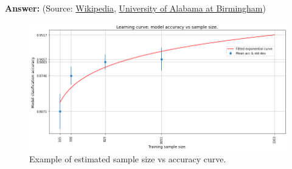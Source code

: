 \documentclass{article}
\newenvironment{QandA}{\begin{enumerate}[label=\arabic*.]}{\end{enumerate}}
\newenvironment{answer}{\par\normalfont \textbf{Answer:}}{}
\begin{document}
\begin{QandA}
\begin{answer}
        (Source: \href{https://en.wikipedia.org/wiki/Sample_complexity#Sample-complexity_bounds}{Wikipedia}, \href{https://sites.uab.edu/periop-datascience/2021/06/28/sample-size-in-machine-learning-and-artificial-intelligence/}{University of Alabama at Birmingham})
    \end{answer}

    \begin{figure}[htb!]
        \centering
        \includegraphics[width=0.9\columnwidth]{img/sample_size.png}
        \caption{Example of estimated sample size vs accuracy curve. \footnotemark }
        \label{fig:sample_size}
    \end{figure}



\end{QandA}
\end{document}

